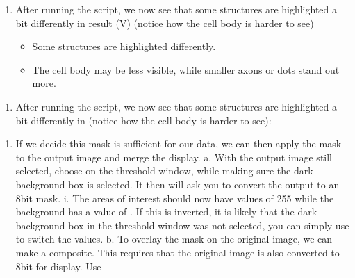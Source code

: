 \documentclass[letterpaper,10pt,english]{jupyterBook}
\begin{document}
\sphinxAtStartPar
{}
\begin{enumerate}
%
\setcounter{enumi}{3}
\item {} 
\sphinxAtStartPar
After running the script, we now see that some structures are highlighted a bit differently
in result (V) (notice how the cell body is harder to see)
\begin{itemize}
\item {} 
\sphinxAtStartPar
Some structures are highlighted differently.

\item {} 
\sphinxAtStartPar
The cell body may be less visible, while smaller axons or dots stand out more.

\end{itemize}

\end{enumerate}

\sphinxAtStartPar
{}
\begin{enumerate}
%
\setcounter{enumi}{4}
\item {} 
\sphinxAtStartPar
After running the script, we now see that some structures are highlighted a bit differently
in  (notice how the cell body is harder to see):

\end{enumerate}

\sphinxAtStartPar
{}
\begin{enumerate}
%
\setcounter{enumi}{5}
\item {} 
\sphinxAtStartPar
If we decide this mask is sufficient for our data, we can then apply the mask to the output
image and merge the display.
a. With the output image still selected, choose  on the threshold window,
while making sure the dark background box is selected. It then will ask you to
convert the output to an 8\sphinxhyphen{}bit mask.
i. The areas of interest should now have values of 255 while the
background has a value of . If this is inverted, it is likely that the dark
background box in the threshold window was not selected, you can simply
use  to switch the values.
b. To overlay the mask on the original image, we can make a composite. This
requires that the original image is also converted to 8\sphinxhyphen{}bit for display. Use 

\end{enumerate}
\end{document}
